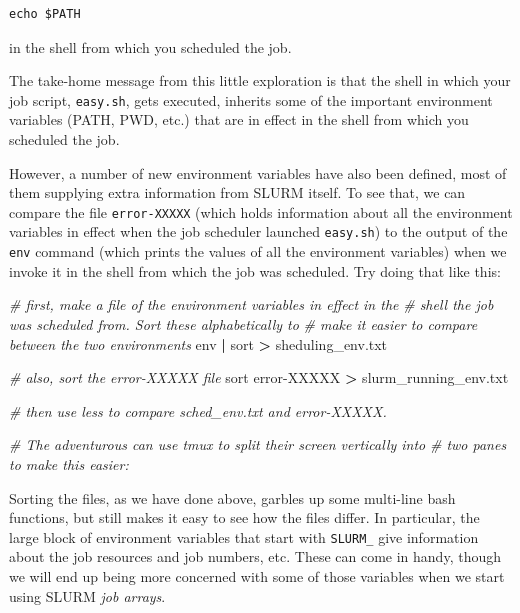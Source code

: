 \documentclass[]{krantz}
\makeatletter
\newenvironment{Shaded}{\begin{snugshade}}{\end{snugshade}}
\newcommand{\CommentTok}[1]{\textcolor[rgb]{0.37,0.37,0.37}{\textit{#1}}}
\newcommand{\FunctionTok}[1]{\textcolor[rgb]{0,0,0}{#1}}
\newcommand{\KeywordTok}[1]{\textcolor[rgb]{0.27,0.27,0.27}{\textbf{#1}}}
\newcommand{\NormalTok}[1]{#1}
\newcommand{\OperatorTok}[1]{\textcolor[rgb]{0.43,0.43,0.43}{\textbf{#1}}}
\newenvironment{kframe}{%
\medskip{}
\setlength{\fboxsep}{.8em}
 \def\at@end@of@kframe{}%
 \ifinner\ifhmode%
  \def\at@end@of@kframe{\end{minipage}}%
  \begin{minipage}{\columnwidth}%
 \fi\fi%
 \def\FrameCommand##1{\hskip\@totalleftmargin \hskip-\fboxsep
 \colorbox{shadecolor}{##1}\hskip-\fboxsep
     \hskip-\linewidth \hskip-\@totalleftmargin \hskip\columnwidth}%
 \MakeFramed {\advance\hsize-\width
   \@totalleftmargin\z@ \linewidth\hsize
   \@setminipage}}%
 {\par\unskip\endMakeFramed%
 \at@end@of@kframe}
\renewenvironment{Shaded}{\begin{kframe}}{\end{kframe}}
\makeatother
\begin{document}
\begin{verbatim}
echo $PATH
\end{verbatim}

in the shell from which you scheduled the job.

The take-home message from this little exploration is that the shell
in which your job script, \texttt{easy.sh}, gets executed, inherits some of the important environment
variables (PATH, PWD, etc.) that are in effect in the shell from which you
scheduled the job.

However, a number of new environment variables have also been defined, most of them
supplying extra information from SLURM itself. To see that, we can compare the
file \texttt{error-XXXXX} (which holds information about all the environment variables
in effect when the job scheduler launched \texttt{easy.sh}) to the output of the
\texttt{env} command (which prints the values of all the environment variables) when we
invoke it in the shell from which the job was scheduled. Try doing that like this:

\begin{Shaded}
\begin{Highlighting}[]
\CommentTok{# first, make a file of the environment variables in effect in the}
\CommentTok{# shell the job was scheduled from.  Sort these alphabetically to}
\CommentTok{# make it easier to compare between the two environments}
\FunctionTok{env} \KeywordTok{|} \FunctionTok{sort} \OperatorTok{>}\NormalTok{ sheduling_env.txt}

\CommentTok{# also, sort the error-XXXXX file}
\FunctionTok{sort}\NormalTok{ error-XXXXX }\OperatorTok{>}\NormalTok{ slurm_running_env.txt}

\CommentTok{# then use less to compare sched_env.txt and error-XXXXX.}

\CommentTok{# The adventurous can use tmux to split their screen vertically into }
\CommentTok{# two panes to make this easier:}
\end{Highlighting}
\end{Shaded}

Sorting the files, as we have done above, garbles up some multi-line bash functions, but
still makes it easy to see how the files differ. In particular, the
large block of environment variables that start with \texttt{SLURM\_} give information
about the job resources and job numbers, etc. These can come in handy, though
we will end up being more concerned with some of those variables when we
start using SLURM \emph{job arrays}.
\end{document}

